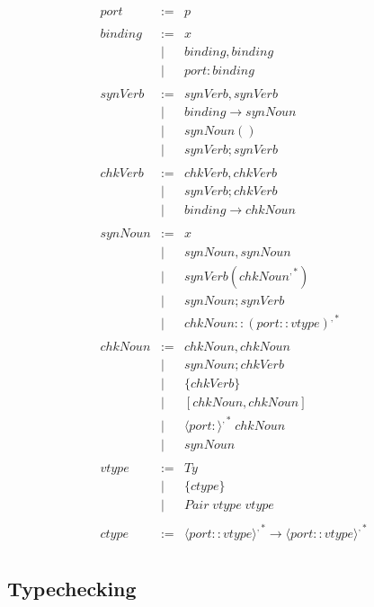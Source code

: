 \documentclass{article}
\newcommand{\Sc}[1]{\mathit{#1}}
\newcommand{\group}[1]{\langle #1 \rangle}
\newcommand{\binding}{\Sc{binding}}
\newcommand{\synVerb}{\Sc{syn\!Verb}}
\newcommand{\chkVerb}{\Sc{chkVerb}}
\newcommand{\synNoun}{\Sc{synNoun}}
\newcommand{\chkNoun}{\Sc{chkNoun}}
\newcommand{\port}{\Sc{port}}
\newcommand{\vtype}{\Sc{vtype}}
\newcommand{\ctype}{\Sc{ctype}}
\begin{document}
\[
\begin{array}{rrl}
\port & := & p \\
\\
\binding & := & x \\
& | & \binding, \binding \\
& | & \port\!:\binding\\
\\
\synVerb & := & \synVerb , \synVerb \\
& | & \binding \rightarrow \synNoun \\
& | & \synNoun() \\
& | & \synVerb ; \synVerb \\
\\
\chkVerb & := & \chkVerb , \chkVerb \\
& | & \synVerb ; \chkVerb \\
& | & \binding \rightarrow \chkNoun \\
\\
\synNoun & := & x \\
&  | & \synNoun , \synNoun \\
&  | & \synVerb(\chkNoun^{,\ast}) \\
&  | & \synNoun ; \synVerb \\
& | & \chkNoun :: (\port :: \vtype)^{,\ast} \\
\\
\chkNoun & := & \chkNoun , \chkNoun \\
& | & \synNoun ; \chkVerb \\
& | & \{ \chkVerb \} \\
& | & [\chkNoun, \chkNoun] \\
& | & \group{\port\!:}^{,\ast} \; \chkNoun \\
& | & \synNoun \\
\\
\vtype & := & Ty \\
& | & \{ \ctype \} \\
& | & Pair \; \vtype \; \vtype \\
\\
\ctype & := & \group{\port :: \vtype}^{,\ast} \rightarrow \group{\port :: \vtype}^{,\ast} \\

\end{array}
\]

\subsection*{Typechecking}
\end{document}
